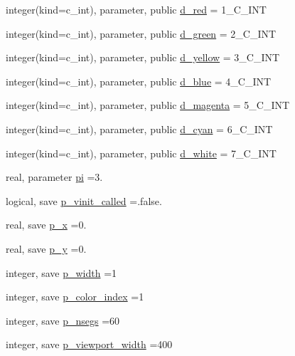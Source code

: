 \begin{DoxyCompactItemize}
integer(kind=c\+\_\+int), parameter, public \mbox{\hyperlink{namespacem__pixel_a79a9da737aa4362052e625bf692e4426}{d\+\_\+red}} = 1\+\_\+\+C\+\_\+\+I\+NT
\item 
integer(kind=c\+\_\+int), parameter, public \mbox{\hyperlink{namespacem__pixel_a7826b243f01d8a4b6a8376a71ff0aab0}{d\+\_\+green}} = 2\+\_\+\+C\+\_\+\+I\+NT
\item 
integer(kind=c\+\_\+int), parameter, public \mbox{\hyperlink{namespacem__pixel_ac67e6b5e1f5dfb58a70f4f63fd92a5b7}{d\+\_\+yellow}} = 3\+\_\+\+C\+\_\+\+I\+NT
\item 
integer(kind=c\+\_\+int), parameter, public \mbox{\hyperlink{namespacem__pixel_af2a1f35244e511380fe83cc31ceb31a8}{d\+\_\+blue}} = 4\+\_\+\+C\+\_\+\+I\+NT
\item 
integer(kind=c\+\_\+int), parameter, public \mbox{\hyperlink{namespacem__pixel_a499c4e58df4136e662c8e15de6ba0b3b}{d\+\_\+magenta}} = 5\+\_\+\+C\+\_\+\+I\+NT
\item 
integer(kind=c\+\_\+int), parameter, public \mbox{\hyperlink{namespacem__pixel_ae515f0991ef77d85371b85c6fdb2a67f}{d\+\_\+cyan}} = 6\+\_\+\+C\+\_\+\+I\+NT
\item 
integer(kind=c\+\_\+int), parameter, public \mbox{\hyperlink{namespacem__pixel_accffd1d4aa8ce679a6049855ea7ab29c}{d\+\_\+white}} = 7\+\_\+\+C\+\_\+\+I\+NT
\item 
real, parameter \mbox{\hyperlink{namespacem__pixel_a2ff737e84d07f927bac2deb1801428a2}{pi}} =3.
\item 
logical, save \mbox{\hyperlink{namespacem__pixel_a5205a23825feacbc005215adc889a710}{p\+\_\+vinit\+\_\+called}} =.false.
\item 
real, save \mbox{\hyperlink{namespacem__pixel_a983dc4bc4ea45266ee8b5100367bedee}{p\+\_\+x}} =0.
\item 
real, save \mbox{\hyperlink{namespacem__pixel_a8bda60db9b6c7c2402e1e12a44bc36aa}{p\+\_\+y}} =0.
\item 
integer, save \mbox{\hyperlink{namespacem__pixel_a0ccc9f9102afdf3b469b3d2cab22aec9}{p\+\_\+width}} =1
\item 
integer, save \mbox{\hyperlink{namespacem__pixel_af37b7b3481f3876270e99200e2554b9f}{p\+\_\+color\+\_\+index}} =1
\item 
integer, save \mbox{\hyperlink{namespacem__pixel_ace7c28c9ae8a890cac3c7fc2d3c2e824}{p\+\_\+nsegs}} =60
\item 
integer, save \mbox{\hyperlink{namespacem__pixel_adaf071a7cca5f7d4404d59c17739fcf3}{p\+\_\+viewport\+\_\+width}} =400

\end{DoxyCompactItemize}
